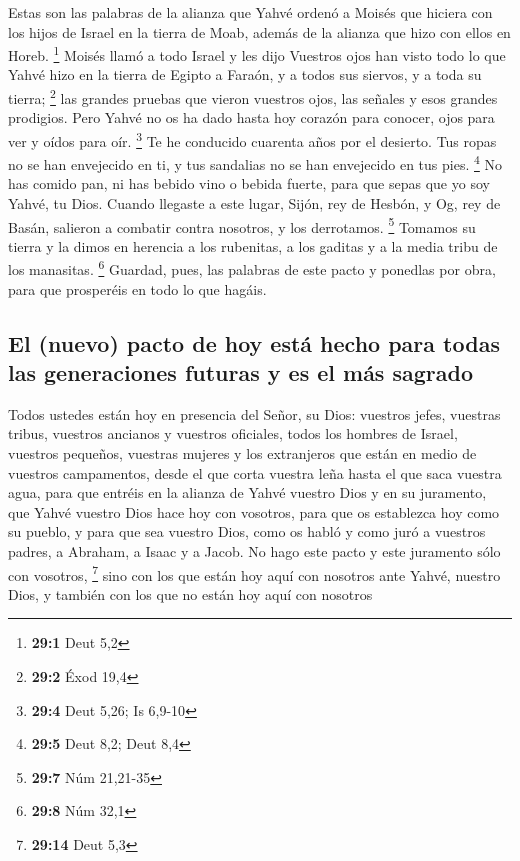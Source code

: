  Estas son las palabras de la alianza que Yahvé ordenó a
Moisés que hiciera con los hijos de Israel en la tierra de Moab, además
de la alianza que hizo con ellos en Horeb. \footnote{\textbf{29:1} Deut
  5,2}  Moisés llamó a todo Israel y les dijo Vuestros
ojos han visto todo lo que Yahvé hizo en la tierra de Egipto a Faraón, y
a todos sus siervos, y a toda su tierra; \footnote{\textbf{29:2} Éxod
  19,4}  las grandes pruebas que vieron vuestros ojos, las
señales y esos grandes prodigios.  Pero Yahvé no os ha
dado hasta hoy corazón para conocer, ojos para ver y oídos para oír.
\footnote{\textbf{29:4} Deut 5,26; Is 6,9-10}  Te he
conducido cuarenta años por el desierto. Tus ropas no se han envejecido
en ti, y tus sandalias no se han envejecido en tus pies. \footnote{\textbf{29:5}
  Deut 8,2; Deut 8,4}  No has comido pan, ni has bebido
vino o bebida fuerte, para que sepas que yo soy Yahvé, tu Dios.
 Cuando llegaste a este lugar, Sijón, rey de Hesbón, y Og,
rey de Basán, salieron a combatir contra nosotros, y los derrotamos.
\footnote{\textbf{29:7} Núm 21,21-35}  Tomamos su tierra y
la dimos en herencia a los rubenitas, a los gaditas y a la media tribu
de los manasitas. \footnote{\textbf{29:8} Núm 32,1} 
Guardad, pues, las palabras de este pacto y ponedlas por obra, para que
prosperéis en todo lo que hagáis.

\hypertarget{el-nuevo-pacto-de-hoy-estuxe1-hecho-para-todas-las-generaciones-futuras-y-es-el-muxe1s-sagrado}{%
\subsection{El (nuevo) pacto de hoy está hecho para todas las
generaciones futuras y es el más
sagrado}\label{el-nuevo-pacto-de-hoy-estuxe1-hecho-para-todas-las-generaciones-futuras-y-es-el-muxe1s-sagrado}}

 Todos ustedes están hoy en presencia del Señor, su Dios:
vuestros jefes, vuestras tribus, vuestros ancianos y vuestros oficiales,
todos los hombres de Israel,  vuestros pequeños, vuestras
mujeres y los extranjeros que están en medio de vuestros campamentos,
desde el que corta vuestra leña hasta el que saca vuestra agua,
 para que entréis en la alianza de Yahvé vuestro Dios y
en su juramento, que Yahvé vuestro Dios hace hoy con vosotros,
 para que os establezca hoy como su pueblo, y para que
sea vuestro Dios, como os habló y como juró a vuestros padres, a
Abraham, a Isaac y a Jacob.  No hago este pacto y este
juramento sólo con vosotros, \footnote{\textbf{29:14} Deut 5,3}
 sino con los que están hoy aquí con nosotros ante Yahvé,
nuestro Dios, y también con los que no están hoy aquí con nosotros

